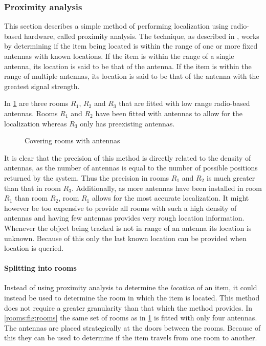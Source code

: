 \subsubsection{Proximity analysis}\label{rooms}
This section describes a simple method of performing localization using radio-based hardware, called proximity analysis.
The technique, as described in \citet[Section II.C Proximity]{wireless_survey}, works by determining if the item being located is within the range of one or more fixed antennas with known locations.
If the item is within the range of a single antenna, its location is said to be that of the antenna.
If the item is within the range of multiple antennas, its location is said to be that of the antenna with the greatest signal strength.

In \cref{rooms:fig:cover} are three rooms $R_1$, $R_2$ and $R_3$ that are fitted with low range radio-based antennas.
Rooms $R_1$ and $R_2$ have been fitted with antennas to allow for the localization whereas $R_3$ only has preexisting antennas.

\begin{figure}[h]
\centering

\caption{Covering rooms with antennas}
\label{rooms:fig:cover}
\end{figure}

It is clear that the precision of this method is directly related to the density of antennas, as the number of antennas is equal to the number of possible positions returned by the system.
Thus the precision in rooms $R_1$ and $R_2$ is much greater than that in room $R_3$.
Additionally, as more antennas have been installed in room $R_1$ than room $R_2$, room $R_1$ allows for the most accurate localization.
It might however be too expensive to provide all rooms with such a high density of antennas and having few antennas provides very rough location information.
Whenever the object being tracked is not in range of an antenna its location is unknown.
Because of this only the last known location can be provided when location is queried.

\paragraph{Splitting into rooms}
Instead of using proximity analysis to determine the \textit{location} of an item, it could instead be used to determine the room in which the item is located.
This method does not require a greater granularity than that which the method provides.
In \cref{rooms:fig:rooms} the same set of rooms as in \cref{rooms:fig:cover} is fitted with only four antennas.
The antennas are placed strategically at the doors between the rooms.
Because of this they can be used to determine if the item travels from one room to another.

